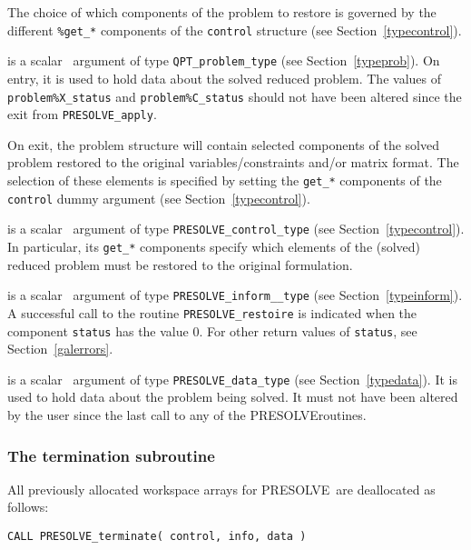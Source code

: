 \documentclass{galahad}
\newcommand{\packagename}{PRESOLVE}
\begin{document}
The choice of which components of the problem to restore is governed by the
different {\tt \%get\_*} components of the {\tt control} structure (see
Section~\ref{typecontrol}).

\begin{description}
 is a scalar \intentinout\ argument of type 
{\tt QPT\_problem\_type}
(see Section~\ref{typeprob}). 
On entry, it is used to hold data about the solved reduced problem. The values
of {\tt problem\%X\_status} and {\tt problem\%C\_status} should not have been
altered since the exit from {\tt \packagename\_apply}.

\noindent
On exit, the problem structure will contain selected components of the solved
problem restored to the original variables/constraints and/or matrix format.
The selection of these elements is specified by setting the {\tt get\_*}
components of the {\tt control} dummy argument (see
Section~\ref{typecontrol}).

 is a scalar \intentin\ argument of type 
{\tt \packagename\_control\_type}
(see Section~\ref{typecontrol}).  In particular, its {\tt get\_*} components
specify which elements of the (solved) reduced problem must be restored to the
original formulation.

 is a scalar \intentout\ argument of type 
{\tt \packagename\_inform\_\_type}
(see Section~\ref{typeinform}). A successful call to the routine
{\tt \packagename\_restoire}
is indicated when the  component {\tt status} has the value 0. 
For other return values of {\tt status}, see Section~\ref{galerrors}.

 is a scalar \intentinout\ argument of type 
{\tt \packagename\_data\_type}
(see Section~\ref{typedata}). It is used to hold data about the problem being 
solved. It must not have been altered by the user since the last call to 
any of the \packagename routines.

\end{description}


\subsubsection{The  termination subroutine}
All previously allocated workspace arrays for \packagename\ are deallocated as
follows: 
\vspace*{1mm}

\hspace{8mm}
{\tt CALL \packagename\_terminate( control, info, data )}
\end{document}
